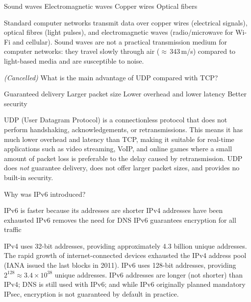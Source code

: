 \documentclass[answers]{exam}
\begin{document}
\begin{questions}
\begin{oneparchoices}
    \correctchoice Sound waves
    \choice Electromagnetic waves
    \choice Copper wires
    \choice Optical fibers
\end{oneparchoices}

\begin{solution}
    Standard computer networks transmit data over copper wires (electrical signals), optical fibres (light pulses), and electromagnetic waves (radio/microwave for Wi-Fi and cellular).
    Sound waves are not a practical transmission medium for computer networks: they travel slowly through air ($\approx$\,343\,m/s) compared to light-based media and are susceptible to noise.
\end{solution}

\question \textit{(Cancelled)} What is the main advantage of UDP compared with TCP?

\begin{oneparchoices}
    \choice Guaranteed delivery
    \choice Larger packet size
    \correctchoice Lower overhead and lower latency
    \choice Better security
\end{oneparchoices}

\begin{solution}
    UDP (User Datagram Protocol) is a connectionless protocol that does not perform handshaking, acknowledgements, or retransmissions.
    This means it has much lower overhead and latency than TCP, making it suitable for real-time applications such as video streaming, VoIP, and online games where a small amount of packet loss is preferable to the delay caused by retransmission.
    UDP does \textit{not} guarantee delivery, does not offer larger packet sizes, and provides no built-in security.
\end{solution}

\question Why was IPv6 introduced?

\begin{choices}
    \choice IPv6 is faster because its addresses are shorter
    \correctchoice IPv4 addresses have been exhausted
    \choice IPv6 removes the need for DNS
    \choice IPv6 guarantees encryption for all traffic
\end{choices}

\begin{solution}
    IPv4 uses 32-bit addresses, providing approximately 4.3 billion unique addresses.
    The rapid growth of internet-connected devices exhausted the IPv4 address pool (IANA issued the last blocks in 2011).
    IPv6 uses 128-bit addresses, providing $2^{128} \approx 3.4 \times 10^{38}$ unique addresses.
    IPv6 addresses are longer (not shorter) than IPv4; DNS is still used with IPv6; and while IPv6 originally planned mandatory IPsec, encryption is not guaranteed by default in practice.
\end{solution}


\end{questions}
\end{document}
